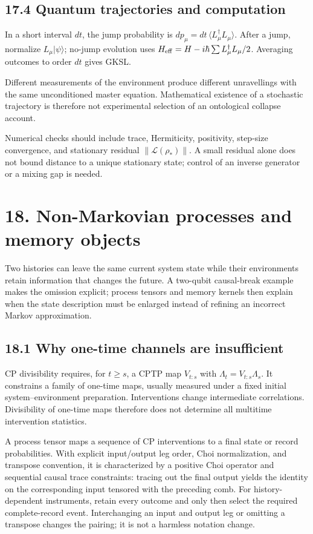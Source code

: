 \documentclass[
  11pt,
  oneside]{book}
\begin{document}
\section{17.4 Quantum trajectories and computation}

In a short interval \(dt\), the jump probability is
\(dp_\mu=dt\,\langle L_\mu^\dagger L_\mu\rangle\). After a jump,
normalize \(L_\mu|\psi\rangle\); no-jump evolution uses
\(H_{\rm eff}=H-i\hbar\sum L_\mu^\dagger L_\mu/2\). Averaging outcomes
to order \(dt\) gives GKSL.

Different measurements of the environment produce different unravellings
with the same unconditioned master equation. Mathematical existence of a
stochastic trajectory is therefore not experimental selection of an
ontological collapse account.

Numerical checks should include trace, Hermiticity, positivity,
step-size convergence, and stationary residual
\(\|\mathcal L(\rho_*)\|\). A small residual alone does not bound
distance to a unique stationary state; control of an inverse generator
or a mixing gap is needed.

\chapter{18. Non-Markovian processes and memory objects}\label{ch-18}

Two histories can leave the same current system state while their
environments retain information that changes the future. A two-qubit
causal-break example makes the omission explicit; process tensors and
memory kernels then explain when the state description must be enlarged
instead of refining an incorrect Markov approximation.

\section{18.1 Why one-time channels are insufficient}

CP divisibility requires, for \(t\ge s\), a CPTP map \(V_{t:s}\) with
\(\Lambda_t=V_{t:s}\Lambda_s\). It constrains a family of one-time maps,
usually measured under a fixed initial system--environment preparation.
Interventions change intermediate correlations. Divisibility of one-time
maps therefore does not determine all multitime intervention statistics.

A process tensor maps a sequence of CP interventions to a final state or
record probabilities. With explicit input/output leg order, Choi
normalization, and transpose convention, it is characterized by a
positive Choi operator and sequential causal trace constraints: tracing
out the final output yields the identity on the corresponding input
tensored with the preceding comb. For history-dependent instruments,
retain every outcome and only then select the required complete-record
event. Interchanging an input and output leg or omitting a transpose
changes the pairing; it is not a harmless notation change.
\end{document}

